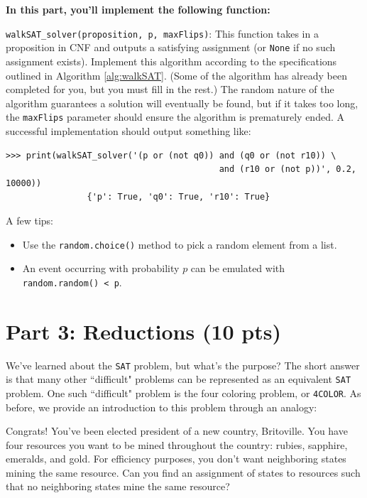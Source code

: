 \documentclass{article}
\begin{document}
    \textbf{In this part, you'll implement the following function:}
    \begin{tcolorbox}[colback=blue!10]
            \lstinline{walkSAT_solver(proposition, p, maxFlips)}: This function takes in a proposition in CNF and outputs a satisfying assignment (or \lstinline{None} if no such assignment exists). Implement this algorithm according to the specifications outlined in Algorithm \ref*{alg:walkSAT}. (Some of the algorithm has already been completed for you, but you must fill in the rest.) The random nature of the algorithm guarantees a solution will eventually be found, but if it takes too long, the \lstinline{maxFlips} parameter should ensure the algorithm is prematurely ended. A successful implementation should output something like:
            \begin{lstlisting}[belowskip=-5pt]
                >>> print(walkSAT_solver('(p or (not q0)) and (q0 or (not r10)) \
                                          and (r10 or (not p))', 0.2, 10000))
                {'p': True, 'q0': True, 'r10': True}
            \end{lstlisting}
            A few tips:
            \begin{itemize}
                \item Use the \lstinline{random.choice()} method to pick a random element from a list. 
                \item An event occurring with probability $p$ can be emulated with \lstinline{random.random() < p}.
            \end{itemize}
    \end{tcolorbox}
    
\section*{Part 3: Reductions (10 pts)}
    We've learned about the \lstinline{SAT} problem, but what's the purpose? The short answer is that many other ``difficult" problems can be represented as an equivalent \lstinline{SAT} problem. One such ``difficult" problem is the four coloring problem, or \lstinline{4COLOR}. As before, we provide an introduction to this problem through an analogy:
    \begin{tcolorbox}[colback=red!10]
        Congrats! You've been elected president of a new country, Britoville. You have four resources you want to be mined throughout the country: rubies, sapphire, emeralds, and gold. For efficiency purposes, you don't want neighboring states mining the same resource. Can you find an assignment of states to resources such that no neighboring states mine the same resource?
    \end{tcolorbox}
\end{document}

